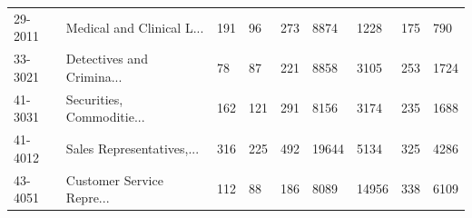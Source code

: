 \begin{longtable}{p{0.9cm}p{3.4cm}p{1.0cm}p{1.05cm}p{1.1cm}p{1.05cm}p{1.0cm}p{1.0cm}p{1.1cm}}
29-2011 & Medical and Clinical L... & 191 & 96 & 273 & 8874 & 1228 & 175 & 790 \\
33-3021 & Detectives and Crimina... & 78 & 87 & 221 & 8858 & 3105 & 253 & 1724 \\
41-3031 & Securities, Commoditie... & 162 & 121 & 291 & 8156 & 3174 & 235 & 1688 \\
41-4012 & Sales Representatives,... & 316 & 225 & 492 & 19644 & 5134 & 325 & 4286 \\
43-4051 & Customer Service Repre... & 112 & 88 & 186 & 8089 & 14956 & 338 & 6109 \\
\end{longtable}
\endgroup
